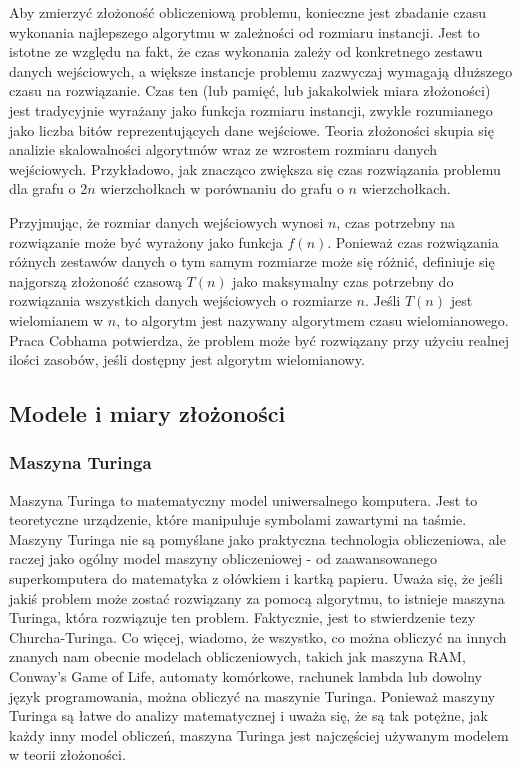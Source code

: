 Aby zmierzyć złożoność obliczeniową problemu, konieczne jest zbadanie czasu wykonania najlepszego algorytmu w zależności od rozmiaru instancji. Jest to istotne ze względu na fakt, że czas wykonania zależy od konkretnego zestawu danych wejściowych, a większe instancje problemu zazwyczaj wymagają dłuższego czasu na rozwiązanie. Czas ten (lub pamięć, lub jakakolwiek miara złożoności) jest tradycyjnie wyrażany jako funkcja rozmiaru instancji, zwykle rozumianego jako liczba bitów reprezentujących dane wejściowe. Teoria złożoności skupia się analizie skalowalności algorytmów wraz ze wzrostem rozmiaru danych wejściowych. Przykładowo, jak znacząco zwiększa się czas rozwiązania problemu dla grafu o $2n$ wierzchołkach w porównaniu do grafu o $n$ wierzchołkach.

Przyjmując, że rozmiar danych wejściowych wynosi $n$, czas potrzebny na rozwiązanie może być wyrażony jako funkcja $f(n)$.  Ponieważ czas rozwiązania różnych zestawów danych o tym samym rozmiarze może się różnić, definiuje się najgorszą złożoność czasową $T(n)$ jako maksymalny czas potrzebny do rozwiązania wszystkich danych wejściowych o rozmiarze $n$.  Jeśli $T(n)$ jest wielomianem w $n$, to algorytm jest nazywany algorytmem czasu wielomianowego. Praca Cobhama potwierdza, że problem może być rozwiązany przy użyciu realnej ilości zasobów, jeśli dostępny jest algorytm wielomianowy.

	\subsection{Modele i miary złożoności}
	
	\subsubsection{Maszyna Turinga}
Maszyna Turinga to matematyczny model uniwersalnego komputera. Jest to teoretyczne urządzenie, które manipuluje symbolami zawartymi na taśmie. Maszyny Turinga nie są pomyślane jako praktyczna technologia obliczeniowa, ale raczej jako ogólny model maszyny obliczeniowej - od zaawansowanego superkomputera do matematyka z ołówkiem i kartką papieru. Uważa się, że jeśli jakiś problem może zostać rozwiązany za pomocą algorytmu, to istnieje maszyna Turinga, która rozwiązuje ten problem. Faktycznie, jest to stwierdzenie tezy Churcha-Turinga. Co więcej, wiadomo, że wszystko, co można obliczyć na innych znanych nam obecnie modelach obliczeniowych, takich jak maszyna RAM, Conway's Game of Life, automaty komórkowe, rachunek lambda lub dowolny język programowania, można obliczyć na maszynie Turinga. Ponieważ maszyny Turinga są łatwe do analizy matematycznej i uważa się, że są tak potężne, jak każdy inny model obliczeń, maszyna Turinga jest najczęściej używanym modelem w teorii złożoności.

